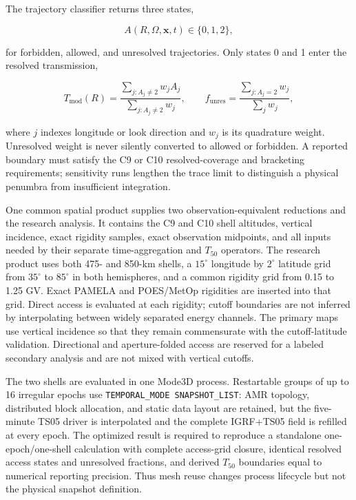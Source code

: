 The trajectory classifier returns three states,
\begin{linenomath*}
\begin{equation}
 A(R,\Omega,\mathbf{x},t) \in \{0,1,2\},
 \label{eq:exp-access-state}
\end{equation}
\end{linenomath*}
for forbidden, allowed, and unresolved trajectories. Only states 0 and 1 enter
the resolved transmission,
\begin{linenomath*}
\begin{equation}
 T_{\mathrm{mod}}(R)=
 \frac{\sum_{j:A_j\ne2} w_j A_j}
      {\sum_{j:A_j\ne2} w_j}, \qquad
 f_{\mathrm{unres}}=
 \frac{\sum_{j:A_j=2}w_j}{\sum_j w_j},
 \label{eq:exp-model-transmission}
\end{equation}
\end{linenomath*}
where $j$ indexes longitude or look direction and $w_j$ is its quadrature
weight. Unresolved weight is never silently converted to allowed or forbidden.
A reported boundary must satisfy the C9 or C10 resolved-coverage and bracketing
requirements; sensitivity runs lengthen the trace limit to distinguish a
physical penumbra from insufficient integration.

One common spatial product supplies two observation-equivalent reductions and
the research analysis. It contains the C9 and C10 shell altitudes, vertical
incidence, exact rigidity samples, exact observation midpoints, and all inputs
needed by their separate time-aggregation and $T_{50}$ operators. The research
product uses both 475- and 850-km shells, a $15^{\circ}$ longitude by
$2^{\circ}$ latitude grid from $35^{\circ}$ to $85^{\circ}$ in both
hemispheres, and a common rigidity grid from 0.15 to 1.25 GV. Exact PAMELA and
POES/MetOp rigidities are inserted into that grid. Direct access is evaluated
at each rigidity; cutoff boundaries are not inferred by interpolating between
widely separated energy channels. The primary maps use vertical incidence so
that they remain commensurate with the cutoff-latitude validation. Directional
and aperture-folded access are reserved for a labeled secondary analysis and
are not mixed with vertical cutoffs.

The two shells are evaluated in one Mode3D process. Restartable groups of up to
16 irregular epochs use \texttt{TEMPORAL\_MODE SNAPSHOT\_LIST}: AMR topology,
distributed block allocation, and static data layout are retained, but the
five-minute TS05 driver is interpolated and the complete IGRF+TS05 field is
refilled at every epoch. The optimized result is required to reproduce a
standalone one-epoch/one-shell calculation with complete access-grid closure,
identical resolved access states and unresolved fractions, and derived
$T_{50}$ boundaries equal to numerical reporting precision. Thus mesh reuse
changes process lifecycle but not the physical snapshot definition.

